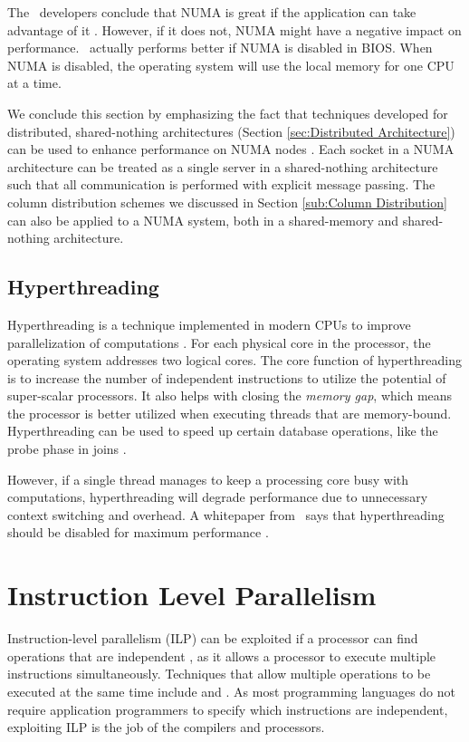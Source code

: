 The \qlikview~developers conclude that NUMA is great if the application can take advantage of it \cite{Qlik2013-an}. However, if it does not, NUMA might have a negative impact on performance. \qlikview~actually performs better if NUMA is disabled in BIOS. When NUMA is disabled, the operating system will use the local memory for one CPU at a time.

We conclude this section by emphasizing the fact that techniques developed for distributed, shared-nothing architectures (Section \ref{sec:Distributed Architecture}) can be used to enhance performance on NUMA nodes \cite{Mukherjee2015-ul}. Each socket in a NUMA architecture can be treated as a single server in a shared-nothing architecture such that all communication is performed with explicit message passing. The column distribution schemes we discussed in Section \ref{sub:Column Distribution} can also be applied to a NUMA system, both in a shared-memory and shared-nothing architecture.

\subsection{Hyperthreading}
\label{sub:Hyperthreading}
Hyperthreading is a technique implemented in modern CPUs to improve parallelization of computations \cite{Wikipedia_contributors2015-yx}. For each physical core in the processor, the operating system addresses two logical cores. The core function of hyperthreading is to increase the number of independent instructions to utilize the potential of super-scalar processors. It also helps with closing the \textit{memory gap}, which means the processor is better utilized when executing threads that are memory-bound. Hyperthreading can be used to speed up certain database operations, like the probe phase in joins \cite{Barber2014-ey}.

However, if a single thread manages to keep a processing core busy with computations, hyperthreading will degrade performance due to unnecessary context switching and overhead. A whitepaper from \qlikview~says that hyperthreading should be disabled for maximum performance \cite{Qlik2011-yc}.

\section{Instruction Level Parallelism}
\label{sec:Instruction Level Parallelism}

Instruction-level parallelism (ILP) can be exploited if a processor can find operations that are independent \cite{Wikipedia_contributors2015-vg}, as it allows a processor to execute multiple instructions simultaneously. Techniques that allow multiple operations to be executed at the same time include  and . As most programming languages do not require application programmers to specify which instructions are independent, exploiting ILP is the job of the compilers and processors.

